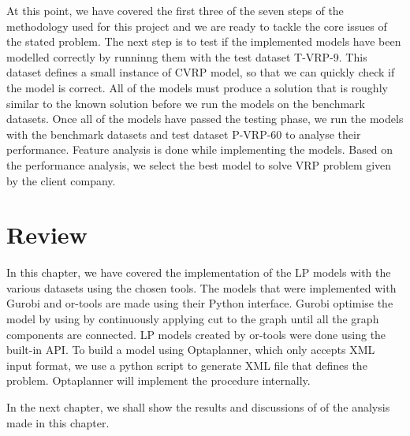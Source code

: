 At this point, we have covered the first three of the seven steps of the methodology used for this project and we are
ready to tackle the core issues of the stated problem. The next step is to test if the implemented models have been modelled
correctly by runninng them with the test dataset T-VRP-9. This dataset defines a small instance of CVRP model, so that we
can quickly check if the model is correct. All of the models must produce a solution that is roughly
similar to the known solution before we run the models on the benchmark datasets. Once all of the models have passed the
testing phase, we run the models with the benchmark datasets and test dataset P-VRP-60 to analyse their performance.
Feature analysis is done while implementing the models. Based on the performance analysis, we select the best model
to solve VRP problem given by the client company.


\section{Review}
In this chapter, we have covered the implementation of the LP models with the various datasets using the chosen tools.
The models that were implemented with Gurobi and or-tools are made using their Python interface. Gurobi optimise the model by using by continuously
 applying cut to the graph until all the graph components are connected.
 LP models created by or-tools were done using the built-in API. To build a model using Optaplanner, which only accepts XML input format, we use a python script to generate XML file that
  defines the problem. Optaplanner will implement the procedure internally.

In the next chapter, we shall show the results and discussions of of the analysis made in this chapter.
